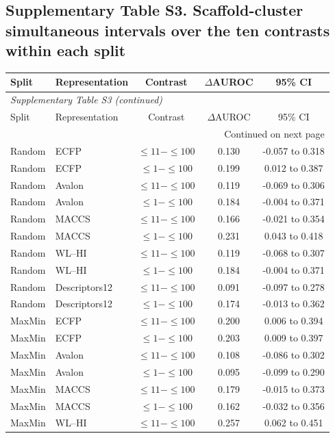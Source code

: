 \subsection*{Supplementary Table S3. Scaffold-cluster simultaneous intervals over the ten contrasts within each split}
\begin{longtable}{llccc}

\toprule Split & Representation & Contrast & $\Delta$AUROC & 95\% CI \\ \midrule\endfirsthead
\multicolumn{5}{l}{\textit{Supplementary Table S3 (continued)}} \\
\toprule Split & Representation & Contrast & $\Delta$AUROC & 95\% CI \\ \midrule\endhead
\midrule\multicolumn{5}{r}{Continued on next page}\\\endfoot
\bottomrule\endlastfoot
Random & ECFP & $\leq11-\leq100$ & 0.130 & -0.057 to 0.318 \\
Random & ECFP & $\leq1-\leq100$ & 0.199 & 0.012 to 0.387 \\
Random & Avalon & $\leq11-\leq100$ & 0.119 & -0.069 to 0.306 \\
Random & Avalon & $\leq1-\leq100$ & 0.184 & -0.004 to 0.371 \\
Random & MACCS & $\leq11-\leq100$ & 0.166 & -0.021 to 0.354 \\
Random & MACCS & $\leq1-\leq100$ & 0.231 & 0.043 to 0.418 \\
Random & WL--HI & $\leq11-\leq100$ & 0.119 & -0.068 to 0.307 \\
Random & WL--HI & $\leq1-\leq100$ & 0.184 & -0.004 to 0.371 \\
Random & Descriptors12 & $\leq11-\leq100$ & 0.091 & -0.097 to 0.278 \\
Random & Descriptors12 & $\leq1-\leq100$ & 0.174 & -0.013 to 0.362 \\
\addlinespace
MaxMin & ECFP & $\leq11-\leq100$ & 0.200 & 0.006 to 0.394 \\
MaxMin & ECFP & $\leq1-\leq100$ & 0.203 & 0.009 to 0.397 \\
MaxMin & Avalon & $\leq11-\leq100$ & 0.108 & -0.086 to 0.302 \\
MaxMin & Avalon & $\leq1-\leq100$ & 0.095 & -0.099 to 0.290 \\
MaxMin & MACCS & $\leq11-\leq100$ & 0.179 & -0.015 to 0.373 \\
MaxMin & MACCS & $\leq1-\leq100$ & 0.162 & -0.032 to 0.356 \\
MaxMin & WL--HI & $\leq11-\leq100$ & 0.257 & 0.062 to 0.451 \\

\end{longtable}
